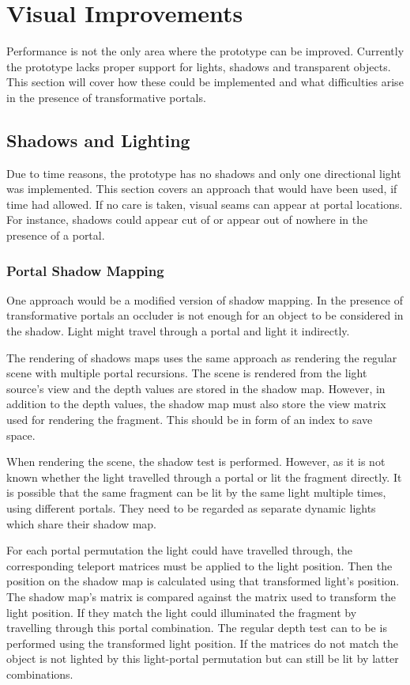 \chapter{Visual Improvements}
Performance is not the only area where the prototype can be improved. Currently the prototype lacks proper support for lights, shadows and transparent objects. This section will cover how these could be implemented and what difficulties arise in the presence of transformative portals.

\section{Shadows and Lighting}
Due to time reasons, the prototype has no shadows and only one directional light was implemented. This section covers an approach that would have been used, if time had allowed. If no care is taken, visual seams can appear at portal locations. For instance, shadows could appear cut of or appear out of nowhere in the presence of a portal.

\subsection{Portal Shadow Mapping}
One approach would be a modified version of shadow mapping. In the presence of transformative portals an occluder is not enough for an object to be considered in the shadow. Light might travel through a portal and light it indirectly.

The rendering of shadows maps uses the same approach as rendering the regular scene with multiple portal recursions. The scene is rendered from the light source's view and the depth values are stored in the shadow map. However, in addition to the depth values, the shadow map must also store the view matrix used for rendering the fragment. This should be in form of an index to save space.

When rendering the scene, the shadow test is performed. However, as it is not known whether the light travelled through a portal or lit the fragment directly. It is possible that the same fragment can be lit by the same light multiple times, using different portals. They need to be regarded as separate dynamic lights which share their shadow map. 

For each portal permutation the light could have travelled through, the corresponding teleport matrices must be applied to the light position. Then the position on the shadow map is calculated using that transformed light's position. The shadow map's matrix is compared against the matrix used to transform the light position. If they match the light could illuminated the fragment by travelling through this portal combination. The regular depth test can to be is performed using the transformed light position. If the matrices do not match the object is not lighted by this light-portal permutation but can still be lit by latter combinations.



